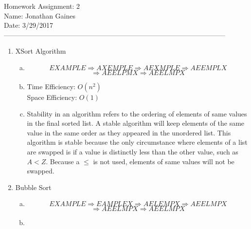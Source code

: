 \documentclass[12pt]{article}
\begin{document}
Homework Assignment: 2\\ 
Name: Jonathan Gaines\\ 
Date: 3/29/2017\\ --------------------------------------------------------------------------------------------------
\begin {enumerate}
\item XSort Algorithm
	\begin {enumerate}[(a)]
		\item
		$$EXAMPLE\Rightarrow 
			AXEMPLE\Rightarrow	
			AEXMPLE\Rightarrow
			AEEMPLX$$ $$\Rightarrow 
		  AEELPMX\Rightarrow
			AEELMPX $$		
		\item
			Time Efficiency: $O(n^{2})$ \\
			Space Efficiency: $O(1)$ 
		\item 
			Stability in an algorithm refers to the ordering of elements of same values in the final sorted list. A stable algorithm will keep elements of the same value in the same order as they appeared in the unordered list. This algorithm is stable because the only circumstance where elements of a list are swapped is if a value is distinctly less than the other value, such as $A < Z$. Because a $\leq$ is not used, elements of same values will not be swapped. \par
	\end {enumerate}
\item Bubble Sort
	\begin {enumerate}[(a)]
		\item
		$$EXAMPLE\Rightarrow 
			EAMPLEX\Rightarrow	
			AELEMPX\Rightarrow
			AEELMPX$$ $$\Rightarrow
			AEELMPX\Rightarrow
			AEELMPX $$
		\item


\end{enumerate}
\end{enumerate}
\end{document}
